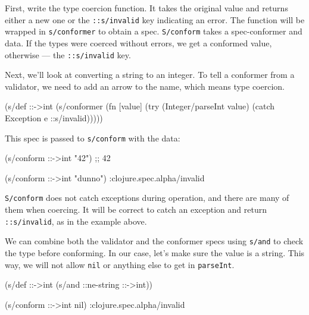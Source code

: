 \label{spec-invalid}

 

First, write the type coercion function. It takes the original value and returns either a new one or the \verb|::s/invalid| key indicating an error. The function will be wrapped in \verb|s/conformer| to obtain a spec.  \verb|S/conform| takes a spec-conformer and data. If the types were coerced without errors, we get a conformed value, otherwise — the \verb|::s/invalid| key.

Next, we'll look at converting a string to an integer. To tell a conformer from a validator, we need to add an arrow to the name, which means type coercion.

\begin{english}
  \begin{clojure}
(s/def ::->int
  (s/conformer
   (fn [value]
     (try
       (Integer/parseInt value)
       (catch Exception e
         ::s/invalid)))))
  \end{clojure}
\end{english}

\noindent
This spec is passed to \verb|s/conform| with the data:

\begin{english}
  \begin{clojure}
(s/conform ::->int "42") ;; 42

(s/conform ::->int "dunno")
:clojure.spec.alpha/invalid
  \end{clojure}
\end{english}


\verb|S/conform| does not catch exceptions during operation, and there are many of them when coercing. It will be correct to catch an exception and return \verb|::s/invalid|, as in the example above.

We can combine both the validator and the conformer specs using \verb|s/and| to check the type before conforming. In our case, let's make sure the value is a string. This way, we will not allow \verb|nil| or anything else to get in \verb|parseInt|.

\begin{english}
  \begin{clojure}
(s/def ::->int
  (s/and ::ne-string ::->int))

(s/conform ::->int nil)
:clojure.spec.alpha/invalid
  \end{clojure}
\end{english}

